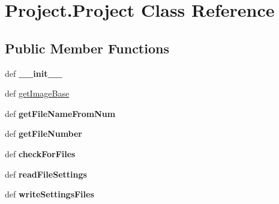 \hypertarget{classProject_1_1Project}{\section{Project.\-Project Class Reference}
\label{classProject_1_1Project}
}
\subsection*{Public Member Functions}
\begin{DoxyCompactItemize}
\item 
\hypertarget{classProject_1_1Project_a59b578ef2b746c294bee8d2ceb8ea3d9}{def {\bfseries \-\_\-\-\_\-init\-\_\-\-\_\-}}\label{classProject_1_1Project_a59b578ef2b746c294bee8d2ceb8ea3d9}

\item 
def \hyperlink{classProject_1_1Project_af5d15337a24279fed5df943cdd17a521}{get\-Image\-Base}
\item 
\hypertarget{classProject_1_1Project_af4f0a9adbac70beed61838e0552b5fce}{def {\bfseries get\-File\-Name\-From\-Num}}\label{classProject_1_1Project_af4f0a9adbac70beed61838e0552b5fce}

\item 
\hypertarget{classProject_1_1Project_a26e3cfe3e056c97f722eeef03137c475}{def {\bfseries get\-File\-Number}}\label{classProject_1_1Project_a26e3cfe3e056c97f722eeef03137c475}

\item 
\hypertarget{classProject_1_1Project_aa4241d0e834f8686b89e977ad6b16d26}{def {\bfseries check\-For\-Files}}\label{classProject_1_1Project_aa4241d0e834f8686b89e977ad6b16d26}

\item 
\hypertarget{classProject_1_1Project_abcb28ed447f9094e8eb6d6a49b0c4294}{def {\bfseries read\-File\-Settings}}\label{classProject_1_1Project_abcb28ed447f9094e8eb6d6a49b0c4294}

\item 
\hypertarget{classProject_1_1Project_a4b58bd09e8457006fb81aa85d7723a7d}{def {\bfseries write\-Settings\-Files}}\label{classProject_1_1Project_a4b58bd09e8457006fb81aa85d7723a7d}

\end{DoxyCompactItemize}
